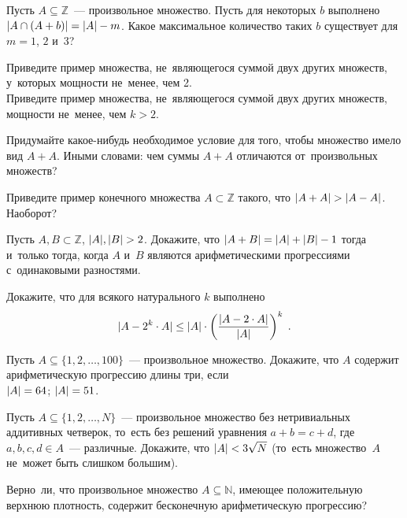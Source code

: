 \begin{problems}

\item
Пусть $A \subseteq \mathbb{Z}$~--- произвольное множество.
Пусть для некоторых $b$ выполнено
\(
    \lvert A \cap (A + b) \rvert = \lvert A \rvert - m
\).
Какое максимальное количество таких $b$ существует для $m = 1$, $2$ и~$3$?

\item
\subproblem
Приведите пример множества, не~являющегося суммой двух других множеств,
у~которых мощности не~менее, чем 2.
\\
\subproblem
Приведите пример множества, не~являющегося суммой двух других множеств,
мощности не~менее, чем $k > 2$.

\item
Придумайте какое-нибудь необходимое условие для того, чтобы множество имело
вид $A + A$.
Иными словами: чем суммы $A + A$ отличаются от~произвольных множеств?

\item
Приведите пример конечного множества $A \subset \mathbb{Z}$ такого, что
\(
    \lvert A + A \rvert > \lvert A - A \rvert
\).
Наоборот?

\item
Пусть $A, B \subset \mathbb{Z}$, $\lvert A \rvert, \lvert B \rvert > 2$.
Докажите, что
\(
    \lvert A + B \rvert
=
    \lvert A \rvert + \lvert B \rvert - 1
\)
тогда и~только тогда, когда $A$ и~$B$ являются арифметическими прогрессиями
с~одинаковыми разностями.

\item
Докажите, что для всякого натурального $k$ выполнено
\[
    \lvert A - 2^{k} \cdot A \rvert
\leq
    \lvert A \rvert \cdot
    \left(
        \frac{\lvert A - 2 \cdot A \rvert}{\lvert A \rvert}
    \right)^k
\;.\]

\item
Пусть $A \subseteq \{ 1,2, \ldots, 100 \}$~--- произвольное множество.
Докажите, что $A$ содержит арифметическую прогрессию длины три, если
\\
\subproblem $\lvert A \rvert = 64$;
\quad
\subproblem $\lvert A \rvert = 51$.

\item
Пусть $A \subseteq \{ 1, 2, \ldots, N \}$~--- произвольное множество без
нетривиальных аддитивных четверок, то~есть без решений уравнения
$a + b = c + d$, где $a, b, c, d \in A$~--- различные.
Докажите, что $\lvert A \rvert < 3 \sqrt{N}$
(то~есть множество~$A$ не~может быть слишком большим).

\item
Верно~ли, что произвольное множество $A \subseteq \mathbb{N}$, имеющее
положительную верхнюю плотность, содержит бесконечную арифметическую
прогрессию?


\end{problems}
